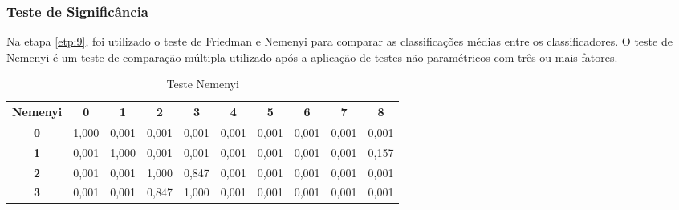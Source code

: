 \subsubsection{Teste de Signific\^ancia}

Na etapa \ref{etp:9}, foi utilizado o teste de Friedman e Nemenyi para comparar as classificações médias entre os classificadores. O teste de Nemenyi é um teste de comparação múltipla utilizado após a aplicação de testes não paramétricos com três ou mais fatores.

\begin{table}[!htpb]
	\centering
	\caption{Teste Nemenyi}
	\begin{tabular}{@{}clllllllll@{}}
		\toprule
		\multicolumn{1}{l}{\textbf{Nemenyi}} & \multicolumn{1}{c}{\textbf{0}} & \multicolumn{1}{c}{\textbf{1}} & \multicolumn{1}{c}{\textbf{2}} & \multicolumn{1}{c}{\textbf{3}} & \multicolumn{1}{c}{\textbf{4}} & \multicolumn{1}{c}{\textbf{5}} & \multicolumn{1}{c}{\textbf{6}} & \multicolumn{1}{c}{\textbf{7}} & \multicolumn{1}{c}{\textbf{8}} \\ \midrule
		\textbf{0}                           & 1,000                          & 0,001                          & 0,001                          & 0,001                          & 0,001                          & 0,001                          & 0,001                          & 0,001                          & 0,001                          \\
		\textbf{1}                           & 0,001                          & 1,000                          & 0,001                          & 0,001                          & 0,001                          & 0,001                          & 0,001                          & 0,001                          & 0,157                          \\
		\textbf{2}                           & 0,001                          & 0,001                          & 1,000                          & 0,847                          & 0,001                          & 0,001                          & 0,001                          & 0,001                          & 0,001                          \\
		\textbf{3}                           & 0,001                          & 0,001                          & 0,847                          & 1,000                          & 0,001                          & 0,001                          & 0,001                          & 0,001                          & 0,001                          \\

\end{tabular}
\end{table}
